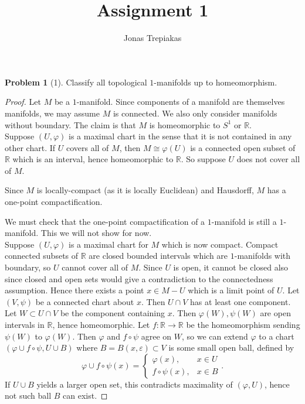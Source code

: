 \documentclass[reqno]{amsart}
\title{Assignment 1}
\author{Jonas Trepiakas}
\date{}
\theoremstyle{definition}
\newtheorem{problem}[theorem]{Problem}
\theoremstyle{remark}
\begin{document}
\maketitle
    
\begin{problem}[1]
    Classify all topological $1$-manifolds up to homeomorphism.
\end{problem}

\begin{proof}
    Let $M$ be a $1$-manifold. Since components of a manifold
    are themselves manifolds, we may assume $M$ is connected.
    We also only consider manifolds without boundary.
    The claim is that $M$ is homeomorphic to
    $S^{1}$ or $\mathbb{R}$.\\
    Suppose
    $\left( U, \varphi  \right) $ is a maximal chart
    in the sense that it is not contained in any 
    other chart. If $U$ covers all of $M$, then
    $M \cong \varphi (U) $ is a connected open subset
    of $\mathbb{R}$ which is an interval, hence
    homeomorphic to $\mathbb{R}$. So suppose
    $U$ does not cover all of $M$. 

    Since $M$ is locally-compact (as it is
    locally Euclidean) and Hausdorff, $M$ has a 
    one-point compactification. 

    We must check that the one-point compactification of a
    $1$-manifold is still a $1$-manifold. This we
    will not show for now.\\
    

    Suppose $\left( U, \varphi  \right) $ is a
    maximal chart for $M$ which is now compact. Compact
    connected
    subsets of $\mathbb{R}$ are closed bounded intervals
    which are $1$-manifolds with boundary, so
    $U$ cannot cover all of $M$. Since
    $U$ is open, it cannot be closed also since 
    closed and open sets would give a contradiction to
    the connectedness assumption. Hence
    there exists a point $x \in M -U$ which is a limit
    point of $U$. Let $\left( V, \psi  \right) $ be a 
    connected
    chart about $x$. Then $U \cap V$ has at least one
    component.
    Let $W \subset U \cap V$ be the component containing $x$.
    Then $\varphi (W), \psi (W)$ are open
    intervals in $\mathbb{R}$, hence homeomorphic.
    Let $f \colon \mathbb{R} \to \mathbb{R}$ be
    the homeomorphism sending
    $\psi (W) $ to $\varphi (W)$. Then
    $\varphi $ and $f \circ \psi $ agree
    on $W$, so we can extend $\varphi $ to a chart
    $\left( \varphi \cup  f \circ \psi ,
    U \cup B \right) $ where
    $B = B\left( x, \varepsilon \right) 
    \subset V$ is some small open ball, defined by
    \[
    \varphi \cup f \circ \psi (x)
    = 
    \begin{cases}
        \varphi (x),& x \in U\\
        f \circ \psi (x),& x \in B
    \end{cases}.
    \] 
    If $U \cup  B$ yields a larger open set,
    this contradicts maximality of $\left( 
    \varphi , U \right) $, hence not such
    ball $B$ can exist. 


\end{proof}
\end{document}
